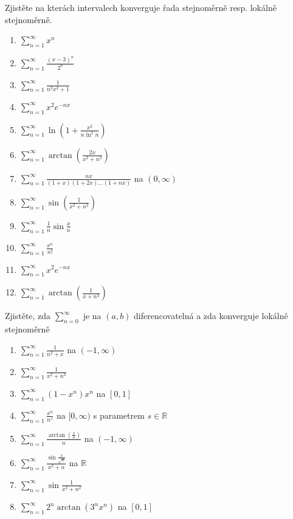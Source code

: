 \begin{multicols}{2}
Zjistěte na kterách intervalech konverguje řada stejnoměrně resp. lokálně stejnoměrně.
\begin{enumerate}
\item $\sum_{n = 1}^\infty x^n$
\item $\sum_{n = 1}^\infty \frac{(x-3)^n}{2^n}$
\item $\sum_{n = 1}^\infty \frac{1}{n^2 x^2 + 1}$
\item $\sum_{n = 1}^\infty x^2 e^{-nx}$
\item $\sum_{n = 1}^\infty \ln \left( 1 + \frac{x^2}{n \ln^2 n } \right)$
\item $\sum_{n = 1}^\infty \arctan \left( \frac{2x}{x^2 + n^3} \right)$
\item $\sum_{n = 1}^\infty \frac{nx}{(1+x)(1+2x)\ldots(1+nx)}$ na $(0,\infty)$
\item $\sum_{n=1}^\infty \sin \left( \frac{1}{x^2 + n^2} \right)$
\item $\sum_{n = 1}^\infty \frac{1}{n} \sin \frac{x}{n}$
\item $\sum_{n = 1}^\infty \frac{x^n}{n!}$
\item $\sum_{n = 1}^\infty x^2 e^{-nx}$
\item $\sum_{n=1}^\infty \arctan \left( \frac{1}{x + n^3} \right)$
\end{enumerate}

\separator

Zjistěte, zda $\sum_{n=0}^{\infty}$ je na $(a,b)$ diferencovatelná a zda konverguje lokálně stejnoměrně
\begin{enumerate}
\item $\sum_{n=1}^\infty \frac{1}{n^2 + x}$ na $(-1, \infty)$
\item $\sum_{n=1}^\infty \frac{1}{x^2 + n^3}$
\item $\sum_{n=1}^\infty (1-x^n) x^n$ na $[0,1]$
\item $\sum_{n=1}^\infty \frac{x^n}{n^s}$ na $[0, \infty)$ s parametrem $s \in \mathbb{R}$
\item $\sum_{n=1}^\infty \frac{\arctan \left( \frac{x}{n} \right)}{n}$ na $(-1, \infty)$
\item $\sum_{n=1}^\infty \frac{\sin \frac{x}{\sqrt{n}}}{x^2 + n}$ na $\mathbb{R}$
\item $\sum_{n=1}^\infty \sin \frac{1}{x^2 + n^2}$
\item $\sum_{n=1}^\infty 2^n \arctan ( 3^n x^n )$ na $[0,1]$
\end{enumerate}

\separator


\end{multicols}
